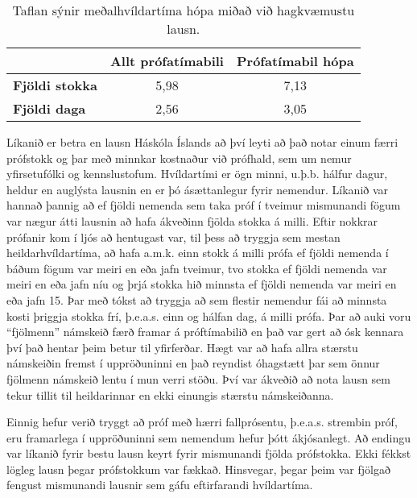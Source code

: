 \documentclass[12pt]{article}
\begin{document}
\newpage
\begin{table}[h]
    \centering
    \begin{tabular}{l|c|c|}
        \cline{2-3}
        & \multicolumn{1}{l|}{\textbf{Allt prófatímabili}} & \multicolumn{1}{l|}{\textbf{Prófatímabil hópa}} \\ \hline
        \multicolumn{1}{|l|}{\textbf{Fjöldi stokka}} & 5,98                                             & 7,13                                            \\ \hline
        \multicolumn{1}{|l|}{\textbf{Fjöldi daga}}   & 2,56                                             & 3,05                                            \\ \hline
    \end{tabular}
    \caption{Taflan sýnir meðalhvíldartíma hópa miðað við hagkvæmustu lausn. }
\end{table}

Líkanið er betra en lausn Háskóla Íslands að því leyti að það notar einum færri prófstokk og þar með minnkar kostnaður við prófhald, sem um nemur yfirsetufólki og kennslustofum. Hvíldartími er ögn minni, u.þ.b. hálfur dagur, heldur en auglýsta lausnin en er þó ásættanlegur fyrir nemendur. 
Líkanið var hannað þannig að ef fjöldi nemenda sem taka próf í tveimur mismunandi fögum var nægur átti lausnin að hafa ákveðinn fjölda stokka á milli. Eftir nokkrar prófanir kom í ljós að hentugast var, til þess að tryggja sem mestan heildarhvíldartíma, að hafa a.m.k. einn stokk á milli prófa ef fjöldi nemenda í báðum fögum var meiri en eða jafn tveimur,  tvo stokka ef fjöldi nemenda var meiri en eða jafn níu og þrjá stokka hið minnsta ef fjöldi nemenda var meiri en eða jafn 15. Þar með tókst að tryggja að sem flestir nemendur fái að minnsta kosti þriggja stokka frí, þ.e.a.s. einn og hálfan dag, á milli prófa. 
Þar að auki voru “fjölmenn” námskeið færð framar á próftímabilið en það var gert að ósk kennara því það hentar þeim betur til yfirferðar. Hægt var að hafa allra stærstu námskeiðin fremst í uppröðuninni en það reyndist óhagstætt þar sem önnur fjölmenn námskeið lentu í mun verri stöðu. Því var ákveðið að nota lausn sem tekur tillit til heildarinnar en ekki einungis stærstu námskeiðanna.

\medskip
Einnig hefur verið tryggt að próf með hærri fallprósentu, þ.e.a.s. strembin próf, eru framarlega í uppröðuninni sem nemendum hefur þótt ákjósanlegt. 
Að endingu var líkanið fyrir bestu lausn keyrt fyrir mismunandi fjölda prófstokka. Ekki fékkst lögleg lausn þegar prófstokkum var fækkað. Hinsvegar, þegar þeim var fjölgað fengust mismunandi lausnir sem gáfu eftirfarandi hvíldartíma.
\end{document}
